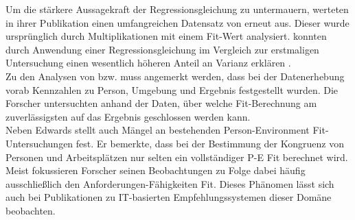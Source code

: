 Um die stärkere Aussagekraft der Regressionsgleichung zu untermauern, werteten \textcite[S. 18ff.]{edwards:1993b}  in ihrer Publikation einen umfangreichen Datensatz von \textcite{mechanismsOfJobStressAndStrain:1982} erneut aus. Dieser wurde ursprünglich durch Multiplikationen mit einem Fit-Wert analysiert. \textcite[S. 18ff.]{edwards:1993b} konnten durch Anwendung einer Regressionsgleichung im Vergleich zur erstmaligen Untersuchung einen wesentlich höheren Anteil an Varianz erklären \cite[S. 8]{su:2015}.\\
Zu den Analysen von \textcite[S. 18ff.]{edwards:1993b} bzw. \textcite{mechanismsOfJobStressAndStrain:1982} muss angemerkt werden, dass bei der Datenerhebung vorab Kennzahlen zu Person, Umgebung und Ergebnis festgestellt wurden. Die Forscher untersuchten anhand der Daten, über welche Fit-Berechnung am zuverlässigsten auf das Ergebnis geschlossen werden kann.\\
Neben Edwards stellt auch \textcite[S. 3]{schneider:2001}\cite[S. 2]{schneider:1978} Mängel an bestehenden Person-Environment Fit-Untersuchungen fest. Er bemerkte, dass bei der Bestimmung der Kongruenz von Personen und Arbeitsplätzen nur selten ein vollständiger P-E Fit berechnet wird. Meist fokussieren Forscher seinen Beobachtungen zu Folge dabei häufig ausschließlich den Anforderungen-Fähigkeiten Fit. Dieses Phänomen lässt sich auch bei Publikationen zu IT-basierten Empfehlungssystemen dieser Domäne beobachten.
